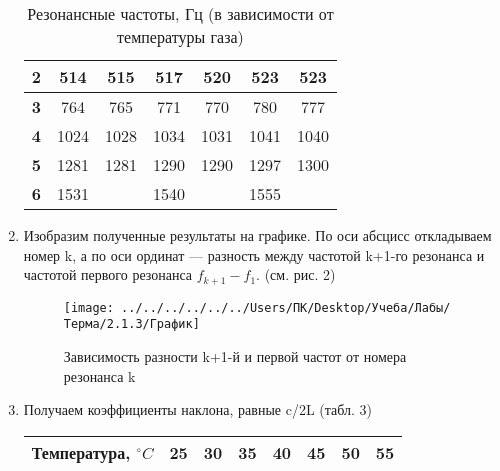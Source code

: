 \documentclass[12pt,a4paper]{article}
\begin{document}
\begin{enumerate}
\begin{table}[!h]
\begin{tabular}{|c|c|c|c|c|c|c|}
				{\color[HTML]{000000} \textbf{2}} & {\color[HTML]{000000} 514} & {\color[HTML]{000000} 515} & {\color[HTML]{000000} 517} & {\color[HTML]{000000} 520} & {\color[HTML]{000000} 523} & {\color[HTML]{000000} 523} \\ \hline
				{\color[HTML]{000000} \textbf{3}} & {\color[HTML]{000000} 764} & {\color[HTML]{000000} 765} & {\color[HTML]{000000} 771} & {\color[HTML]{000000} 770} & {\color[HTML]{000000} 780} & {\color[HTML]{000000} 777} \\ \hline
				{\color[HTML]{000000} \textbf{4}} & {\color[HTML]{000000} 1024} & {\color[HTML]{000000} 1028} & {\color[HTML]{000000} 1034} & {\color[HTML]{000000} 1031} & {\color[HTML]{000000} 1041} & {\color[HTML]{000000} 1040} \\ \hline
				{\color[HTML]{000000} \textbf{5}} & {\color[HTML]{000000} 1281} & {\color[HTML]{000000} 1281} & {\color[HTML]{000000} 1290} & {\color[HTML]{000000} 1290} & {\color[HTML]{000000} 1297} & {\color[HTML]{000000} 1300} \\ \hline
				{\color[HTML]{000000} \textbf{6}} & {\color[HTML]{000000} 1531} & {\color[HTML]{000000} } & {\color[HTML]{000000} 1540} & {\color[HTML]{000000} } & {\color[HTML]{000000} 1555} & {\color[HTML]{000000} } \\ \hline
			\end{tabular}
			\caption{Резонансные частоты, Гц (в зависимости от температуры газа)}
		\end{table}
	\item Изобразим полученные результаты на графике. По оси абсцисс откладываем номер k, а по оси ординат --- разность между частотой k+1-го резонанса и частотой первого резонанса $f_{k+1} - f_1$. (см. рис. 2) 
	\begin{figure}[!h]
		\centering
		\texttt{[image: ../../../../../../Users/ПК/Desktop/Учеба/Лабы/Терма/2.1.3/График]}
		\caption{Зависимость разности k+1-й и первой частот от номера резонанса k}
		\label{fig:}
	\end{figure}
	\item Получаем коэффициенты наклона, равные c/2L (табл. 3)
	\begin{table}[!h]
		\centering
		\begin{tabular}{|l|l|l|l|l|l|l|l|}
			\hline
			\textbf{Температура, $^\circ C$} & {\color[HTML]{000000} 25} & {\color[HTML]{000000} 30} & {\color[HTML]{000000} 35} & {\color[HTML]{000000} 40} & {\color[HTML]{000000} 45} & {\color[HTML]{000000} 50} & {\color[HTML]{000000} 55} \\ \hline

\end{tabular}
\end{table}
\end{enumerate}
\end{document}

